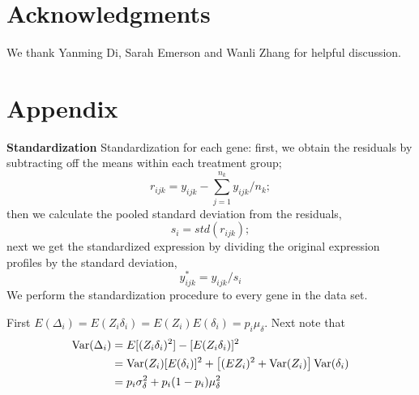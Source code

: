 \documentclass[useAMS,usenatbib, galley]{biom}
\begin{document}
	
	
	
	
	
	\section{Acknowledgments}\label{section:acknowledgment}
	
	We thank Yanming Di, Sarah Emerson and Wanli Zhang for helpful discussion. 
	
	\newpage
	
	
	
		
	
	\section*{Appendix}\label{section:appendix}
	
		
		\textbf{Standardization} 
		Standardization for each gene: first, we obtain the residuals by subtracting off the means within each treatment group;
		\begin{equation}
		r_{ijk} = y_{ijk} - \sum_{j=1}^{n_k}{y}_{ijk}/n_k;
		\end{equation}
		then we calculate the pooled standard deviation from the residuals,
		\begin{equation}
		s_i = \textit{std}(r_{ijk});
		\end{equation}
		next we get the standardized expression by dividing the original expression profiles by the standard deviation,
		\begin{equation}
		y^{\ast}_{ijk} = y_{ijk}/s_i
		\end{equation}
		We perform the standardization procedure to every gene in the data set. 
		
	
	First $E(\Delta_i) = E(Z_i\delta_i) = E(Z_i)E(\delta_i) = p_i\mu_{\delta}$. Next note that  
	\begin{equation}\notag
	\begin{aligned}
	\text{Var}(\Delta_i) & = E[(Z_i\delta_i)^2]- [E(Z_i\delta_i)]^2 \\
	& = \text{Var}(Z_i)[E(\delta_i)]^2 + \left[(EZ_i)^2 + \text{Var}(Z_i)\right]\text{Var}(\delta_i) \\
	& =p_i\sigma_{\delta}^2 + p_i(1-p_i)\mu_{\delta}^2
	\end{aligned}
	\end{equation}
	
\end{document}
